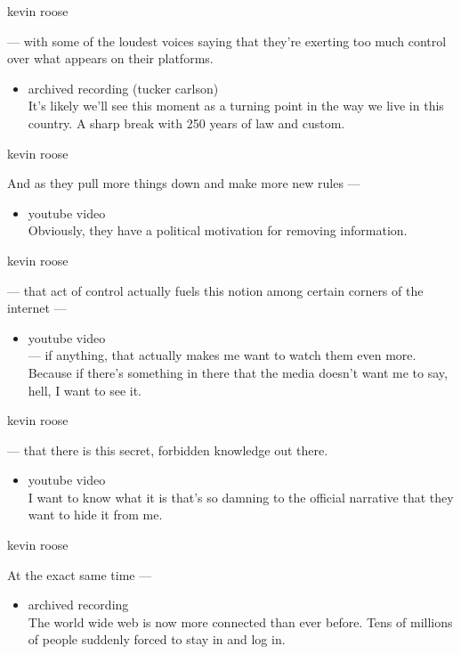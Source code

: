 kevin roose

--- with some of the loudest voices saying that they're exerting too
much control over what appears on their platforms.

\begin{itemize}
\tightlist
\item
  archived recording (tucker carlson)\\
  It's likely we'll see this moment as a turning point in the way we
  live in this country. A sharp break with 250 years of law and custom.
\end{itemize}

kevin roose

And as they pull more things down and make more new rules ---

\begin{itemize}
\tightlist
\item
  youtube video\\
  Obviously, they have a political motivation for removing information.
\end{itemize}

kevin roose

--- that act of control actually fuels this notion among certain corners
of the internet ---

\begin{itemize}
\tightlist
\item
  youtube video\\
  --- if anything, that actually makes me want to watch them even more.
  Because if there's something in there that the media doesn't want me
  to say, hell, I want to see it.
\end{itemize}

kevin roose

--- that there is this secret, forbidden knowledge out there.

\begin{itemize}
\tightlist
\item
  youtube video\\
  I want to know what it is that's so damning to the official narrative
  that they want to hide it from me.
\end{itemize}

kevin roose

At the exact same time ---

\begin{itemize}
\tightlist
\item
  archived recording\\
  The world wide web is now more connected than ever before. Tens of
  millions of people suddenly forced to stay in and log in.
\end{itemize}

